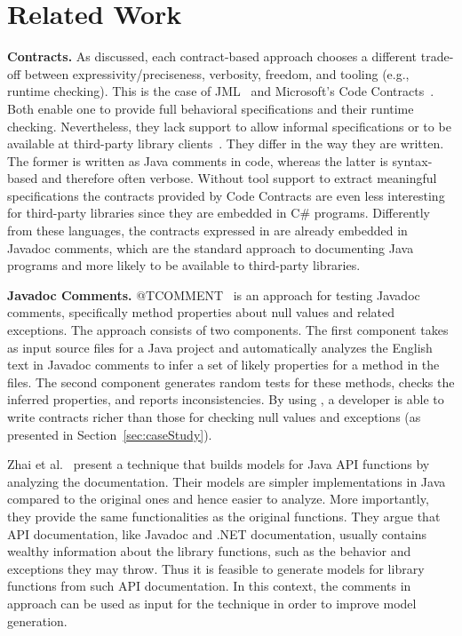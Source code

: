 \section{Related Work}
\label{sec:relatedWork}

\textbf{Contracts.} 
As discussed, each contract-based approach choo\-ses 
a different trade-off
between expressivity/preciseness, verbosity, freedom, and tooling (e.g., runtime checking).
This is the case of JML~\cite{jml} and Microsoft's Code Contracts~\cite{codeContractsPaper}.
Both enable one to provide full behavioral specifications and their runtime checking.
Nevertheless, they lack support to allow informal specifications or to be available at third-party
library clients~\cite{Parnas2011}. They differ in the way they are written. 
The former is written as Java comments in code, whereas the latter is syntax-based 
and therefore often verbose. Without tool support to extract meaningful specifications
the contracts provided by Code Contracts are even less interesting for third-party 
libraries since they are embedded in C\# programs. Differently from these languages, the contracts expressed in \contractjdoc{} are already embedded in Javadoc comments, which are the standard approach to documenting Java programs and more likely to be available to third-party libraries.

\textbf{Javadoc Comments.}
@TCOMMENT~\cite{atComment} is an approach for testing Javadoc comments, specifically
method properties about null values and related exceptions. The approach consists of two components. The first component takes as input
source files for a Java project and automatically analyzes the English text in Javadoc comments to
infer a set of likely properties for a method in the files. The second component generates random
tests for these methods, checks the inferred properties, and reports inconsistencies. By using
\contractjdoc{}, a developer is able to write contracts richer than those for checking null values and
exceptions (as presented in Section~\ref{sec:caseStudy}).

Zhai et al.~\cite{docAnalysis} present a technique that builds models for Java API functions
by analyzing the documentation. Their models are simpler implementations in Java compared to the
original ones and hence easier to analyze. More importantly, they provide the same functionalities
as the original functions. They argue that API documentation, like Javadoc and .NET documentation,
usually contains wealthy information about the library functions, such as the behavior and exceptions they may throw. Thus it is feasible to generate models for library functions from such API documentation. In this context, the comments in \contractjdoc{} approach can be used as input for the technique in order to improve model generation.

